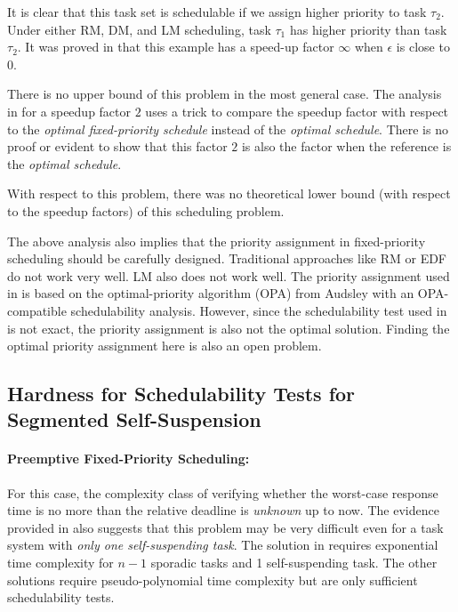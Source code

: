 It is clear that this task set is schedulable if we assign higher priority to
task $\tau_2$.
Under either RM, DM, and LM scheduling, task $\tau_1$ has higher priority than task $\tau_2$. It was proved in \cite{huangpass:dac2015} that this example has a speed-up factor $\infty$ when $\epsilon$ is close to $0$.

There is no upper bound of this problem in the most general case. The analysis in \cite{huangpass:dac2015} for a speedup factor $2$ uses a trick to compare the speedup factor with respect to the \emph{optimal fixed-priority schedule} instead of the \emph{optimal schedule}. There is no proof or evident to show that this factor $2$ is also the factor when the reference is the \emph{optimal schedule}.

With respect to this problem, there was no theoretical lower bound (with respect to the speedup factors) of this scheduling problem. 


The above analysis also implies that the priority assignment in fixed-priority scheduling should be carefully designed. Traditional approaches like RM or EDF do not work very well. LM also does not work well. The priority assignment used in \cite{huangpass:dac2015} is based on the optimal-priority algorithm (OPA) from Audsley \cite{audsley-1993} with an OPA-compatible schedulability analysis. However, since the schedulability test used in \cite{huangpass:dac2015}  is not exact, the priority assignment is also not the optimal solution.
Finding the optimal priority assignment here is also an open problem.


\subsection{Hardness for Schedulability Tests for Segmented Self-Suspension}
\paragraph{Preemptive Fixed-Priority Scheduling:}   
For this case, the complexity class of verifying whether the worst-case response time is no more than the relative deadline is \emph{unknown} up to now. The evidence provided in \cite{ecrts15nelissen} also suggests that this problem may be very difficult even for a task system with \emph{only one self-suspending task}. The solution in \cite{ecrts15nelissen}  requires exponential time complexity for $n-1$ sporadic tasks and 1 self-suspending task. The other solutions \cite{Huang:multiseg}\cite{PH:rtss98} require pseudo-polynomial time complexity but are only sufficient schedulability tests.

